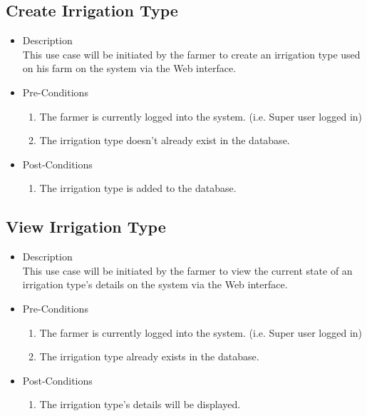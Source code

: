 \documentclass[11pt,fleqn]{book} %
\begin{document}
		\subsection{Create Irrigation Type}
		\begin{itemize}
			\item Description\\
			This use case will be initiated by the farmer to create an irrigation type used on his farm on the system via the Web interface.
			\item Pre-Conditions
			\begin{enumerate}
				\item The farmer is currently logged into the system. (i.e. Super user logged in)
				\item The irrigation type doesn’t already exist in the database. 
			\end{enumerate}
			\item Post-Conditions
			\begin{enumerate}
				\item The irrigation type is added to the database.	
			\end{enumerate}
		\end{itemize}
		
		\subsection{View Irrigation Type}
		\begin{itemize}
			\item Description\\
			This use case will be initiated by the farmer to view the current state of an irrigation type’s details on the system via the Web interface.
			\item Pre-Conditions
			\begin{enumerate}
				\item The farmer is currently logged into the system. (i.e. Super user logged in)
				\item The irrigation type already exists in the database.				
			\end{enumerate}
			\item Post-Conditions
			\begin{enumerate}
				\item The irrigation type’s details will be displayed.
			\end{enumerate}
		\end{itemize}
		
\end{document}
